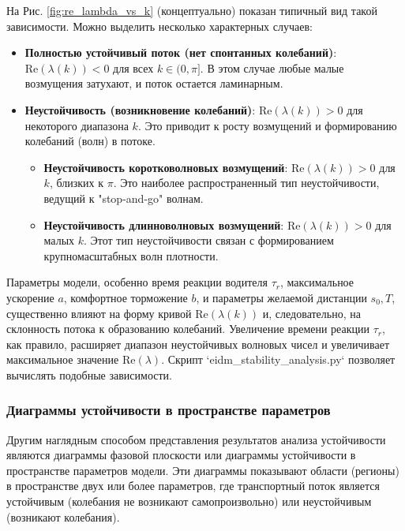 \documentclass[12pt, a4paper]{article}
\begin{document}
На Рис. \ref{fig:re_lambda_vs_k} (концептуально) показан типичный вид такой зависимости. Можно выделить несколько характерных случаев:
\begin{itemize}
    \item \textbf{Полностью устойчивый поток (нет спонтанных колебаний)}: $\text{Re}(\lambda(k)) < 0$ для всех $k \in (0, \pi]$. В этом случае любые малые возмущения затухают, и поток остается ламинарным.
    \item \textbf{Неустойчивость (возникновение колебаний)}: $\text{Re}(\lambda(k)) > 0$ для некоторого диапазона $k$. Это приводит к росту возмущений и формированию колебаний (волн) в потоке.
    \begin{itemize}
        \item \textbf{Неустойчивость коротковолновых возмущений}: $\text{Re}(\lambda(k)) > 0$ для $k$, близких к $\pi$. Это наиболее распространенный тип неустойчивости, ведущий к "stop-and-go" волнам.
        \item \textbf{Неустойчивость длинноволновых возмущений}: $\text{Re}(\lambda(k)) > 0$ для малых $k$. Этот тип неустойчивости связан с формированием крупномасштабных волн плотности.
    \end{itemize}
\end{itemize}
Параметры модели, особенно время реакции водителя $\tau_r$, максимальное ускорение $a$, комфортное торможение $b$, и параметры желаемой дистанции $s_0, T$, существенно влияют на форму кривой $\text{Re}(\lambda(k))$ и, следовательно, на склонность потока к образованию колебаний. Увеличение времени реакции $\tau_r$, как правило, расширяет диапазон неустойчивых волновых чисел и увеличивает максимальное значение $\text{Re}(\lambda)$. Скрипт `eidm_stability_analysis.py` позволяет вычислять подобные зависимости.

\subsubsection{Диаграммы устойчивости в пространстве параметров}
\label{subsubsec:stability_diagrams_params}

Другим наглядным способом представления результатов анализа устойчивости являются диаграммы фазовой плоскости или диаграммы устойчивости в пространстве параметров модели. Эти диаграммы показывают области (регионы) в пространстве двух или более параметров, где транспортный поток является устойчивым (колебания не возникают самопроизвольно) или неустойчивым (возникают колебания).

\end{document}
